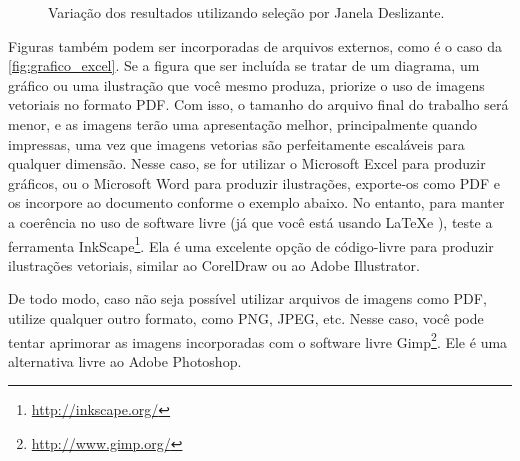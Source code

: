 \begin{figure}[!htb]
  \caption{Variação dos resultados utilizando seleção por Janela Deslizante.}
  \label{fig:grafico_dados}
  \begin{center}
\end{center}
\end{figure}


Figuras também podem ser incorporadas de arquivos externos, como é o caso da \autoref{fig:grafico_excel}.
  Se a figura que ser incluída se tratar de um diagrama, um gráfico ou uma ilustração que você mesmo produza, priorize o uso de imagens vetoriais no formato PDF.
  Com isso, o tamanho do arquivo final do trabalho será menor, e as imagens terão uma apresentação melhor, principalmente quando impressas, uma vez que imagens vetorias são perfeitamente escaláveis para qualquer dimensão.
  Nesse caso, se for utilizar o Microsoft Excel para produzir gráficos, ou o Microsoft Word para produzir ilustrações, exporte-os como PDF e os incorpore ao documento conforme o exemplo abaixo.
  No entanto, para manter a coerência no uso de software livre (já que você está usando \LaTeX e \abnTeX), teste a ferramenta \textsf{InkScape}\footnote{\url{http://inkscape.org/}}.
  Ela é uma excelente opção de código-livre para produzir ilustrações vetoriais, similar ao CorelDraw ou ao Adobe Illustrator.
  
De todo modo, caso não seja possível utilizar arquivos de imagens como PDF, utilize qualquer outro formato, como PNG, JPEG, etc.
  Nesse caso, você pode tentar aprimorar as imagens incorporadas com o software livre \textsf{Gimp}\footnote{\url{http://www.gimp.org/}}.
  Ele é uma alternativa livre ao Adobe Photoshop.

